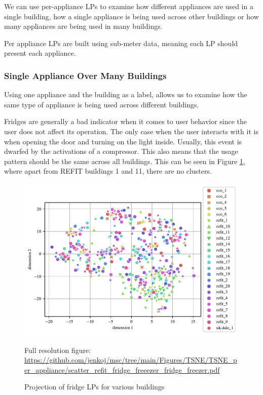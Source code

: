 We can use per-appliance LPs to examine how different appliances 
are used in a single building, how a single appliance is being used across other buildings or how many appliances are being used in many buildings.

Per appliance LPs are built using sub-meter data,
meaning each LP should present each appliance.

\subsubsection{Single Appliance Over Many Buildings}

Using one appliance and the building as a label,
allows us to examine how the same type of appliance is being used across different buildings.

Fridges are generally a bad indicator when it comes to user behavior since the user does not affect its operation. 
The only case when the user interacts with it is when opening the door and turning on the light inside. 
Usually, this event is dwarfed by the activations of a compressor. 
This also means that the usage pattern should be the same across all buildings. 
This can be seen in Figure \ref{fig:tsne_pa_scatter_all_fridge}, 
where apart from REFIT buildings 1 and 11, there are no clusters.


\begin{figure}[H]
	\centering
	\caption{Projection of fridge LPs for various buildings}
	\includegraphics[]{Figures/TSNE/TSNE_per_appliance/scatter_refit_fridge_freeezer_fridge_freezer.pdf}
	\label{fig:tsne_pa_scatter_all_fridge}
	\par
	\par\footnotesize{Full resolution figure: \url{https://github.com/jenkoj/msc/tree/main/Figures/TSNE/TSNE_per_appliance/scatter_refit_fridge_freeezer_fridge_freezer.pdf}}
\end{figure}

